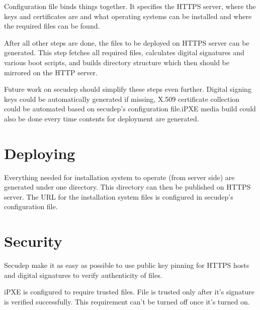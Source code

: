Configuration file binds things together. It specifies the HTTPS
server, where the keys and certificates are and what operating systems
can be installed and where the required files can be found.

After all other steps are done, the files to be deployed on HTTPS
server can be generated. This step fetches all required files,
calculates digital signatures and various boot scripts, and builds
directory structure which then should be mirrored on the HTTP server.

Future work on secudep should simplify these steps even further.
Digital signing keys could be automatically generated if missing,
X.509 certificate collection could be automated based on secudep's
configuration file.\@ iPXE media build could also be done every time
contents for deployment are generated.

\section{Deploying}

Everything needed for installation system to operate (from server
side) are generated under one directory. This directory can then be
published on HTTPS server. The URL for the installation system files
is configured in secudep's configuration file.

\section{Security}

Secudep make it as easy as possible to use public key pinning for
HTTPS hosts and digital signatures to verify authenticity of files.

iPXE is configured to require trusted files. File is trusted only
after it's signature is verified successfully. This requirement can't
be turned off once it's turned on.
